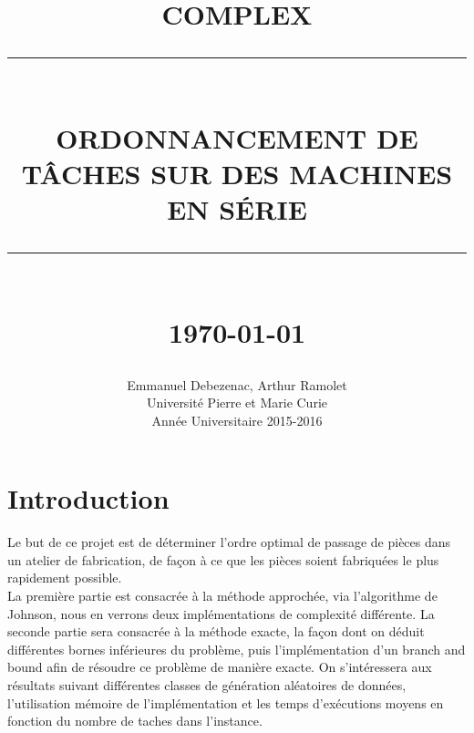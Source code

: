 \documentclass[12pt]{article}
\newcommand{\HRule}[1]{\rule{\linewidth}{#1}}
\begin{document}
\title{ \normalsize \textsc{COMPLEX}
		\\ [2.0cm]
		\HRule{0.5pt} \\
		\LARGE \textbf{\uppercase{Ordonnancement de tâches sur des machines en série}}
		\HRule{2pt} \\ [0.5cm]
		\normalsize \today \vspace*{5\baselineskip}}

\date{}

\author{
		Emmanuel Debezenac, Arthur Ramolet \\ 
		Université Pierre et Marie Curie \\
		Année Universitaire 2015-2016 }

\maketitle

\newpage
\tableofcontents

\newpage
\sectionfont{\scshape}


\clearpage
\newpage
\section{Introduction}

Le but de ce projet est de déterminer l'ordre optimal de passage de pièces dans un atelier de fabrication, de façon à ce que les pièces soient fabriquées le plus rapidement possible.\\

La première partie est consacrée à la méthode approchée, via l'algorithme de Johnson, nous en verrons deux implémentations de complexité différente.
La seconde partie sera consacrée à la méthode exacte, la façon dont on déduit différentes bornes inférieures du problème, puis l'implémentation d'un branch and bound afin de résoudre ce problème de manière exacte. On s'intéressera aux résultats suivant différentes classes de génération aléatoires de données, l'utilisation mémoire de l'implémentation et les temps d'exécutions moyens en fonction du nombre de taches dans l'instance.

\clearpage
\newpage
\end{document}
